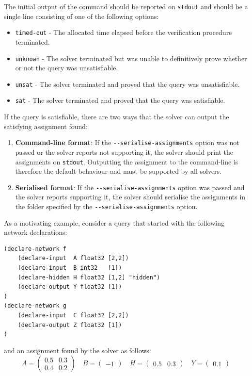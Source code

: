 \noindent The initial output of the command should be reported on \texttt{stdout} and should be a single line consisting of one of the following options: 
\begin{itemize}
\item \texttt{timed-out} - The allocated time elapsed before the verification procedure terminated.
\item \texttt{unknown} - The solver terminated but was unable to definitively prove whether or not the query was unsatisfiable.
\item \texttt{unsat} - The solver terminated and proved that the query was unsatisfiable.
\item \texttt{sat} - The solver terminated and proved that the query was satisfiable.
\end{itemize}
If the query is satisfiable, there are two ways that the solver can output the satisfying assignment found:
\begin{enumerate}
\item \textbf{Command-line format}: If the \texttt{-{}-serialise-assignments} option was not passed or the solver reports not supporting it, the solver should print the assignments on \texttt{stdout}. Outputting the assignment to the command-line is therefore the default behaviour and must be supported by all solvers.
\item \textbf{Serialised format}: If the \texttt{-{}-serialise-assignments} option was passed and the solver reports supporting it, the solver should serialise the assignments in the folder specified by the \texttt{-{}-serialise-assignments} option.
\end{enumerate}
As a motivating example, consider a \vnnlib{} query that started with the following network declarations:
\begin{lstlisting}[style=bash]
(declare-network f
    (declare-input  A float32 [2,2])
    (declare-input  B int32   [1])
    (declare-hidden H float32 [1,2] "hidden")
    (declare-output Y float32 [1])
)
(declare-network g
    (declare-input  C float32 [2,2])
    (declare-output Z float32 [1])
)
\end{lstlisting}
and an assignment found by the solver as follows:
\begin{equation*}
A = \begin{pmatrix}
0.5 & 0.3 \\
0.4 & 0.2
\end{pmatrix}
\quad
B = \begin{pmatrix}
-1
\end{pmatrix}
\quad
H = \begin{pmatrix}
0.5 & 0.3
\end{pmatrix}
\quad
Y = \begin{pmatrix}
0.1
\end{pmatrix}
\end{equation*}
